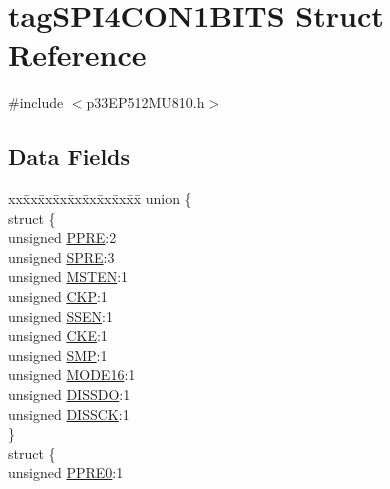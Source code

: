 \hypertarget{structtag_s_p_i4_c_o_n1_b_i_t_s}{}\section{tag\+S\+P\+I4\+C\+O\+N1\+B\+I\+TS Struct Reference}
\label{structtag_s_p_i4_c_o_n1_b_i_t_s}


{\ttfamily \#include $<$p33\+E\+P512\+M\+U810.\+h$>$}

\subsection*{Data Fields}
\begin{DoxyCompactItemize}
\item 
\begin{tabbing}
xx\=xx\=xx\=xx\=xx\=xx\=xx\=xx\=xx\=\kill
union \{\\
\>struct \{\\
\>\>unsigned \hyperlink{structtag_s_p_i4_c_o_n1_b_i_t_s_a328a5a76e4d964cd323b8fc7ec480a65}{PPRE}:2\\
\>\>unsigned \hyperlink{structtag_s_p_i4_c_o_n1_b_i_t_s_ac4fc398d060ce31eebf7055f67519250}{SPRE}:3\\
\>\>unsigned \hyperlink{structtag_s_p_i4_c_o_n1_b_i_t_s_acb4900cdfd8a4b59377c2aa8a4fc82c5}{MSTEN}:1\\
\>\>unsigned \hyperlink{structtag_s_p_i4_c_o_n1_b_i_t_s_afb5f6f71e7650f128b6e5c04036cd48f}{CKP}:1\\
\>\>unsigned \hyperlink{structtag_s_p_i4_c_o_n1_b_i_t_s_ae77e6e9fafcdae4e5b7f261d00459ade}{SSEN}:1\\
\>\>unsigned \hyperlink{structtag_s_p_i4_c_o_n1_b_i_t_s_ad6e30ba11b5574f8a5f548a818b64186}{CKE}:1\\
\>\>unsigned \hyperlink{structtag_s_p_i4_c_o_n1_b_i_t_s_a94751e12e00a82cf122e0d82aa7cfdbf}{SMP}:1\\
\>\>unsigned \hyperlink{structtag_s_p_i4_c_o_n1_b_i_t_s_ae096fb6fc65299accb5c75e3d306e425}{MODE16}:1\\
\>\>unsigned \hyperlink{structtag_s_p_i4_c_o_n1_b_i_t_s_a2cbce11395d8c5eb5f91ba935acaea6b}{DISSDO}:1\\
\>\>unsigned \hyperlink{structtag_s_p_i4_c_o_n1_b_i_t_s_ac9a14e83bad7551e878fdaed7d16bfa3}{DISSCK}:1\\
\>\} \\
\>struct \{\\
\>\>unsigned \hyperlink{structtag_s_p_i4_c_o_n1_b_i_t_s_ae7a242158d2a5a81e609501ba93b1d20}{PPRE0}:1\\

\end{tabbing}
\end{DoxyCompactItemize}
